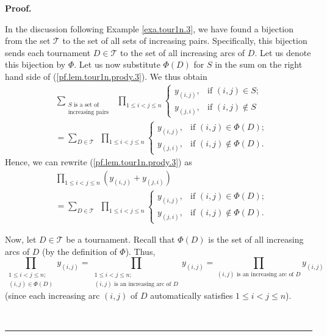 \documentclass[numbers=enddot,12pt,final,onecolumn,notitlepage]{scrartcl}%
\numberwithin{exer}{subsection}
\theoremstyle{definition}
\newenvironment{fineprint}{\begin{small}}{\end{small}}
\newenvironment{proof}[1][Proof]{\noindent\textbf{#1.} }{\ \rule{0.5em}{0.5em}}
\let\sumnonlimits\sum
\let\prodnonlimits\prod
\renewcommand{\sum}{\sumnonlimits\limits}
\renewcommand{\prod}{\prodnonlimits\limits}
\begin{document}
\begin{proof}
\begin{fineprint}
In the discussion following Example \ref{exa.tour1n.3}, we have found a
bijection from the set $\mathcal{T}$ to the set of all sets of increasing
pairs. Specifically, this bijection sends each tournament $D\in\mathcal{T}$ to
the set of all increasing arcs of $D$. Let us denote this bijection by $\Phi$.
Let us now substitute $\Phi\left(  D\right)  $ for $S$ in the sum on the right
hand side of (\ref{pf.lem.tour1n.prody.3}). We thus obtain%
\begin{align*}
&  \sum_{\substack{S\text{ is a set of}\\\text{increasing pairs}}%
}\ \ \prod_{1\leq i<j\leq n}%
\begin{cases}
y_{\left(  i,j\right)  }, & \text{if }\left(  i,j\right)  \in S;\\
y_{\left(  j,i\right)  }, & \text{if }\left(  i,j\right)  \notin S
\end{cases}
\\
&  =\sum_{D\in\mathcal{T}}\ \ \prod_{1\leq i<j\leq n}%
\begin{cases}
y_{\left(  i,j\right)  }, & \text{if }\left(  i,j\right)  \in\Phi\left(
D\right)  ;\\
y_{\left(  j,i\right)  }, & \text{if }\left(  i,j\right)  \notin\Phi\left(
D\right)  .
\end{cases}
\end{align*}
Hence, we can rewrite (\ref{pf.lem.tour1n.prody.3}) as%
\begin{align}
&  \prod_{1\leq i<j\leq n}\left(  y_{\left(  i,j\right)  }+y_{\left(
j,i\right)  }\right) \nonumber\\
&  =\sum_{D\in\mathcal{T}}\ \ \prod_{1\leq i<j\leq n}%
\begin{cases}
y_{\left(  i,j\right)  }, & \text{if }\left(  i,j\right)  \in\Phi\left(
D\right)  ;\\
y_{\left(  j,i\right)  }, & \text{if }\left(  i,j\right)  \notin\Phi\left(
D\right)  .
\end{cases}
\label{pf.lem.tour1n.prody.4}%
\end{align}


Now, let $D\in\mathcal{T}$ be a tournament. Recall that $\Phi\left(  D\right)
$ is the set of all increasing arcs of $D$ (by the definition of $\Phi$).
Thus,
\[
\prod_{\substack{1\leq i<j\leq n;\\\left(  i,j\right)  \in\Phi\left(
D\right)  }}y_{\left(  i,j\right)  }=\prod_{\substack{1\leq i<j\leq
n;\\\left(  i,j\right)  \text{ is an increasing arc of }D}}y_{\left(
i,j\right)  }=\prod_{\left(  i,j\right)  \text{ is an increasing arc of }%
D}y_{\left(  i,j\right)  }%
\]
(since each increasing arc $\left(  i,j\right)  $ of $D$ automatically
satisfies $1\leq i<j\leq n$).


\end{fineprint}
\end{proof}
\end{document}
